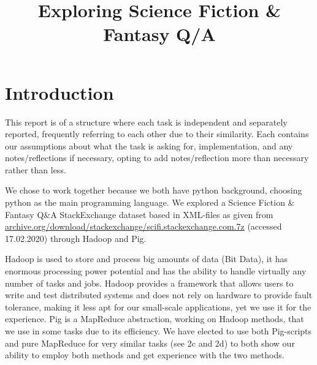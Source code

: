 \documentclass[fleqn,10pt]{wlscirep}
\title{Exploring Science Fiction \& Fantasy Q/A}
\author{}
\begin{document}







\flushbottom
\maketitle


\section{Introduction}
This report is of a structure where each task is independent and separately reported, frequently referring to each other due to their similarity. Each contains our assumptions about what the task is asking for, implementation, and any notes/reflections if necessary, opting to add notes/reflection more than necessary rather than less.

We chose to work together because we both have python background, choosing python as the main programming language. We explored a Science Fiction \& Fantasy Q\&A StackExchange dataset based in XML-files as given from \url{archive.org/download/stackexchange/scifi.stackexchange.com.7z} (accessed 17.02.2020) through Hadoop and Pig. 

Hadoop is used to store and process big amounts of data (Bit Data), it has enormous processing power potential and has the ability to handle virtually any number of tasks and jobs. Hadoop provides a framework that allows users to write and test distributed systems and does not rely on hardware to provide fault tolerance, making it less apt for our small-scale applications, yet we use it for the experience. Pig is a MapReduce abstraction, working on Hadoop methods, that we use in some tasks due to its efficiency. We have elected to use both Pig-scripts and pure MapReduce for very similar tasks (see 2c and 2d) to both show our ability to employ both methods and get experience with the two methods.
\end{document}
